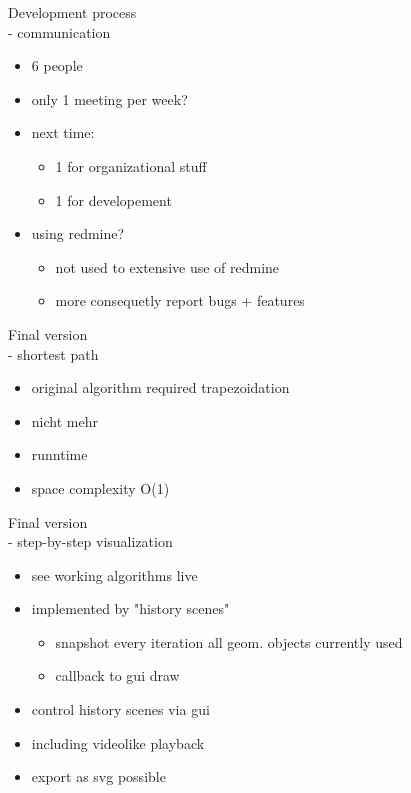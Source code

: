 \documentclass[ucs,9ptb]{beamer}
\begin{document}
\begin{frame}{Development process\\- communication}
  \begin{itemize}
    \item 6 people
    \item only 1 meeting per week?
    \item next time:
    \begin{itemize}
      \item 1 for organizational stuff
      \item 1 for developement
    \end{itemize}
    \item using redmine?
    \begin{itemize}
      \item not used to extensive use of redmine
      \item more consequetly report bugs + features
    \end{itemize}
  \end{itemize}
\end{frame}


\begin{frame}{Final version\\- shortest path}
  \begin{itemize}
    \item original algorithm required trapezoidation
    \item nicht mehr
    \item runntime
    \item space complexity O(1)
  \end{itemize}
\end{frame}

\begin{frame}{Final version\\- step-by-step visualization}
  \begin{itemize}
    \item see working algorithms live
    \item implemented by "history scenes"
    \begin{itemize}
      \item snapshot every iteration 
            all geom. objects currently used
      \item callback to gui draw
    \end{itemize}
    \item control history scenes via gui
    \item including videolike playback
    \item export as svg possible
  \end{itemize}
\end{frame}
\end{document}
